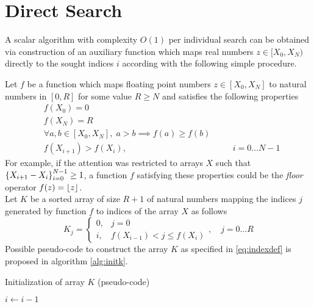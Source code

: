 \documentclass[preprint,1p,times]{elsarticle}
\begin{document}
\section{Direct Search}
\label{sec:directmethod}
A scalar algorithm with complexity $O(1)$ per individual search can be obtained via construction of an auxiliary function which maps real numbers $z\in[X_{0},X_{N})$ directly to the sought indices $i$ according with the following simple procedure.

Let $f$ be a function which maps floating point numbers $z\in[X_{0},X_{N}]$ to natural numbers in $[0,R]$ for some value $R \geq N$ and satisfies the following properties
\begin{subequations}
\label{eq:fprop}
\begin{align}
&f(X_0)=0 \\
&f(X_N)=R \label{eq:lastf} \\
&\forall a,b \in[X_{0},X_{N}], \; a>b \implies f(a) \geq f(b) \label{eq:monotonic} \\
&f(X_{i+1}) > f(X_i), &&\quad  i=0 \dots N-1 \label{eq:f-monotonic}
\end{align}
\end{subequations}
For example, if the attention was restricted to arrays $X$ such that $\left \{ X_{i+1}-X_i \right \}_{i=0}^{N-1} \geq 1$, a function $f$ satisfying these properties could be the \textit{floor} operator $f(z)=\left \lfloor z \right \rfloor$. \\
Let $K$ be a sorted array of size $R+1$ of natural numbers mapping the indices $j$ generated by function $f$ to indices of the array $X$ as follows
\begin{equation}
\label{eq:indexdef}
K_{j}=\left\{ 
	\begin{array}{ll}
		0, & j=0 \\
		i, & f(X_{i-1}) < j \leq f(X_i)
	\end{array}, \quad j=0\dots R
\right.
\end{equation}
Possible pseudo-code to construct the array $K$ as specified in \eqref{eq:indexdef} is proposed in algorithm \eqref{alg:initk}.
\begin{algorithm}[ht]
	\caption{Initialization of array $K$ (pseudo-code)}
	\label{alg:initk}
	\begin{algorithmic}
		\Repeat
			  
			\EndWhile

			   		
		
			\State $i \leftarrow i-1$
		\EndFunction
	\end{algorithmic}
\end{algorithm}
\end{document}
